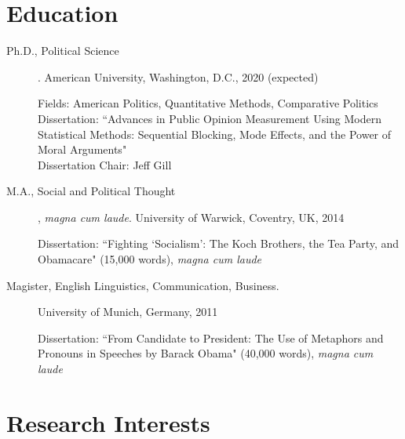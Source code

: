 \documentclass[10pt]{article}
\begin{document}
\begin{flushleft}


\vspace{0.1cm}

\section*{Education}

\begin{description}
\item[{\sc Ph.D.}, Political Science]\hspace{-0.175cm}. American University,
Washington, D.C., 2020 (expected) \par
Fields: American Politics, Quantitative Methods, Comparative Politics \\ 
Dissertation: ``Advances in Public Opinion Measurement Using Modern Statistical Methods: Sequential Blocking, Mode Effects, and the Power of Moral Arguments"\\
Dissertation Chair: Jeff Gill\\
\end{description}

\begin{description}
\item[{\sc M.A.}, Social and Political Thought]\hspace{-0.175cm}, \textit{magna cum laude}. University of Warwick, Coventry, UK, 2014 \par
Dissertation: ``Fighting `Socialism': The Koch Brothers, the Tea Party, and Obamacare" (15,000 words), \textit{magna cum laude} \\
\end{description}

\begin{description}
\item[{\sc Magister}, English Linguistics, Communication, Business.] University of Munich, Germany, 2011 \par
Dissertation: ``From Candidate to President: The Use of Metaphors and Pronouns in Speeches by Barack Obama" (40,000 words), \textit{magna cum laude} \\
\end{description}




\section*{Research Interests}


\end{flushleft}
\end{document}
